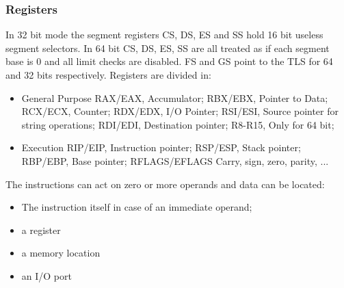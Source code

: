 \documentclass[paper=a4, fontsize=11pt]{report} %
\numberwithin{equation}{section} %
\numberwithin{figure}{section} %
\numberwithin{table}{section} %
\begin{document}
\subsubsection{Registers}
In 32 bit mode the segment registers CS, DS, ES and SS hold 16 bit useless 
segment selectors. In 64 bit CS, DS, ES, SS are all treated as if each segment 
base is 0 and all limit checks are disabled. FS and GS point to the TLS for 64 
and 32 bits respectively. Registers are divided in:
\begin{itemize}
	\item General Purpose
	\subitem RAX/EAX, Accumulator;
	\subitem RBX/EBX, Pointer to Data;
	\subitem RCX/ECX, Counter;
	\subitem RDX/EDX, I/O Pointer;
	\subitem RSI/ESI, Source pointer for string operations;
	\subitem RDI/EDI, Destination pointer;
	\subitem R8-R15, Only for 64 bit;
	\item Execution
	\subitem RIP/EIP, Instruction pointer;
	\subitem RSP/ESP, Stack pointer;
	\subitem RBP/EBP, Base pointer;
	\subitem RFLAGS/EFLAGS Carry, sign, zero, parity, ...
\end{itemize}
\newpage
The instructions can act on zero or more operands and data can be located:
\begin{itemize}
	\item The instruction itself in case of an immediate operand;
	\item a register
	\item a memory location
	\item an I/O port
\end{itemize}
\glsaddall
\printglossaries
\end{document}
